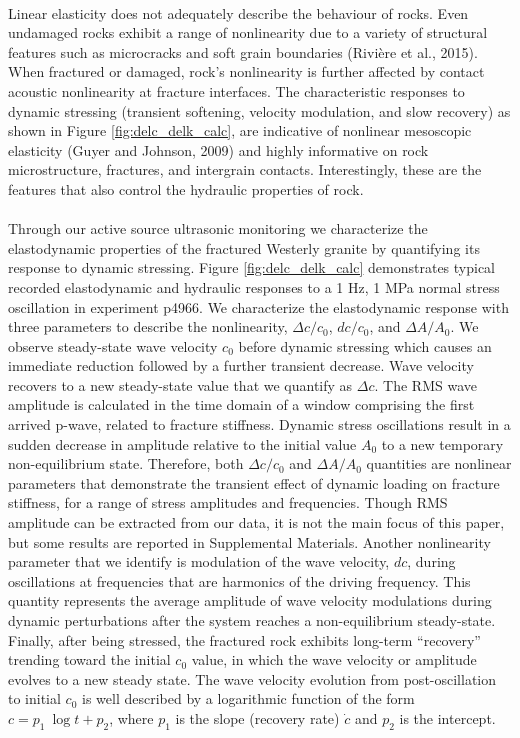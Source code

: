 \documentclass[letterpaper,10pt]{article}
\begin{document}
\paragraph{}
Linear elasticity does not adequately describe the behaviour of rocks. Even undamaged rocks exhibit a range of nonlinearity due to a variety of structural features such as microcracks and soft grain boundaries (Rivière et al., 2015). When fractured or damaged, rock's nonlinearity is further affected by contact acoustic nonlinearity at fracture interfaces. The characteristic responses to dynamic stressing (transient softening, velocity modulation, and slow recovery) as shown in Figure \ref{fig:delc_delk_calc}, are indicative of nonlinear mesoscopic elasticity (Guyer and Johnson, 2009) and highly informative on rock microstructure, fractures, and intergrain contacts. Interestingly, these are the features that also control the hydraulic properties of rock.

\paragraph{}
Through our active source ultrasonic monitoring we characterize the elastodynamic properties of the fractured Westerly granite by quantifying its response to dynamic stressing. Figure \ref{fig:delc_delk_calc} demonstrates typical recorded elastodynamic and hydraulic responses to a 1 Hz, 1 MPa normal stress oscillation in experiment p4966. We characterize the elastodynamic response with three parameters to describe the nonlinearity, $ \Delta c/c_0 $, $ dc/c_0 $, and $ \Delta A/A_0 $. We observe steady-state wave velocity $ c_0 $ before dynamic stressing which causes an immediate reduction followed by a further transient decrease. Wave velocity recovers to a new steady-state value that we quantify as  $ \Delta c $.
The RMS wave amplitude is calculated in the time domain of a window comprising the first arrived p-wave, related to fracture stiffness. Dynamic stress oscillations result in a sudden decrease in amplitude relative to the initial value  $ A_0 $ to a new temporary non-equilibrium state. Therefore, both $ \Delta c/c_0 $ and $ \Delta A/A_0 $ quantities are nonlinear parameters that demonstrate the transient effect of dynamic loading on fracture stiffness, for a range of stress amplitudes and frequencies. Though RMS amplitude can be extracted from our data, it is not the main focus of this paper, but some results are reported in Supplemental Materials.  
Another nonlinearity parameter that we identify is modulation of the wave velocity, $ dc $, during oscillations at frequencies that are harmonics of the driving frequency. This quantity represents the average amplitude of wave velocity modulations during dynamic perturbations after the system reaches a non-equilibrium steady-state. Finally, after being stressed, the fractured rock exhibits long-term ``recovery'' trending toward the initial $ c_0 $ value, in which the wave velocity or amplitude evolves to a new steady state. The wave velocity evolution from post-oscillation to initial $ c_0 $ is well described by a logarithmic function of the form $ c = p_1\ \log{t} + p_2 $, where $p_1$ is the slope (recovery rate) $ \dot c $ and $p_2$ is the intercept. 
\end{document}
